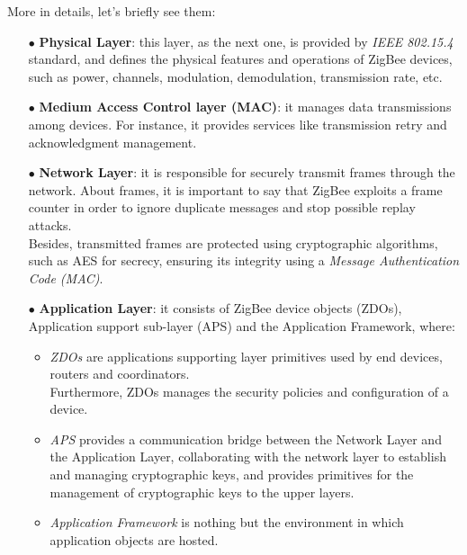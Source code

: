 \documentclass[12pt]{report}
\begin{document}
{More in details, let's briefly see them: 

\begin{itemize}
\setlength{\itemindent}{+4mm}
\item[$\bullet$] \textbf{Physical Layer}: this layer, as the next one, is provided by \emph{IEEE 802.15.4} standard, and defines the physical features and operations of ZigBee devices, such as power, channels, modulation, demodulation, transmission rate, etc.
\item[$\bullet$] \textbf{Medium Access Control layer (MAC)}: it manages data transmissions among devices. For instance, it provides services like transmission retry and acknowledgment management.
\item[$\bullet$] \textbf{Network Layer}: it is responsible for securely transmit frames through the network. 
About frames, it is important to say that ZigBee exploits a frame counter in order to ignore duplicate messages and stop possible replay attacks.\\Besides, transmitted frames are protected using cryptographic algorithms, such as AES for secrecy, ensuring its integrity using a \emph{Message Authentication Code (MAC)}.

\item[$\bullet$] \textbf{Application Layer}: it consists of ZigBee device objects (ZDOs), Application support sub-layer (APS) and the Application Framework, where: 

\begin{itemize}
\item \emph{ZDOs} are applications supporting layer primitives used by end devices, routers and coordinators.\\ 
Furthermore, ZDOs manages the security policies and configuration of a device.
\item \emph{APS} provides a communication bridge between the Network Layer and the Application Layer, collaborating with the network layer to establish and managing cryptographic keys, and provides primitives for the management of cryptographic keys to the upper layers.
\item \emph{Application Framework} is nothing but the environment in which application objects are hosted.\\

\end{itemize}
\end{itemize}

}
\end{document}

